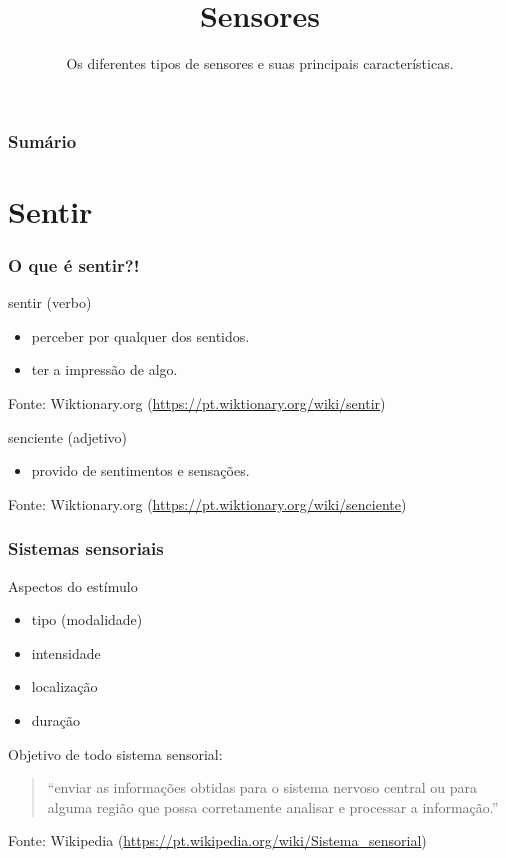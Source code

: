 \documentclass[t]{beamer}
\title{Sensores}
\subtitle{Os diferentes tipos de sensores e suas principais características.}
\begin{document}
\frame{\titlepage}

\begin{frame}
	\frametitle{Sumário}
	\tableofcontents
\end{frame}

\section{Sentir}

\begin{frame}
	\frametitle{O que é sentir?!}
	sentir (verbo)
	\begin{itemize}
		\item perceber por qualquer dos sentidos.
		\item ter a impressão de algo.
	\end{itemize}
	{\scriptsize Fonte: Wiktionary.org (\url{https://pt.wiktionary.org/wiki/sentir})}\\
	\bigskip
	
	senciente (adjetivo)
	\begin{itemize}
		\item provido de sentimentos e sensações.
	\end{itemize}
	{\scriptsize Fonte: Wiktionary.org (\url{https://pt.wiktionary.org/wiki/senciente})}\\
\end{frame}

\begin{frame}
	\frametitle{Sistemas sensoriais}
	Aspectos do estímulo
	\begin{itemize}
		\item tipo (modalidade)
		\item intensidade
		\item localização
		\item duração
	\end{itemize}
	Objetivo de todo sistema sensorial:
	\begin{quote}
		``enviar as informações obtidas para o sistema nervoso central ou para alguma região que possa corretamente analisar e processar a informação.''
	\end{quote}
	{\scriptsize Fonte: Wikipedia (\url{https://pt.wikipedia.org/wiki/Sistema_sensorial})}
\end{frame}
\end{document}
